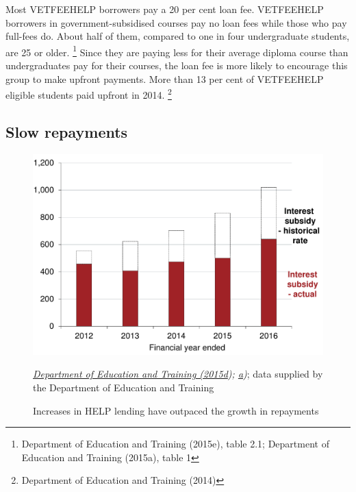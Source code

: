 \documentclass[embargoed]{grattan}
\begin{document}
{Most \gls{VETFEEHELP} borrowers pay a 20 per cent loan fee.
\gls{VETFEEHELP} borrowers in government-subsidised courses pay no loan fees while those who pay full-fees do.
About half of them, compared to one in four undergraduate students, are 25 or older.%
\footnote{Department of Education and Training (2015e), table 2.1; Department of Education and Training (2015a), table 1} Since they are paying less for their average diploma course than undergraduates pay for their courses, the loan fee is more likely to encourage this group to make upfront payments.
More than 13 per cent of \gls{VETFEEHELP} eligible students paid upfront in 2014.%
\footnote{Department of Education and Training (2014)}

\subsection{Slow repayments }\label{slow-repayments}

\begin{figure}
\caption{Increases in \gls{HELP} lending have outpaced the growth in repayments}\label{fig:fig7-increases-help-lending-outpaced-growth-repayments}


\includegraphics[page=7]{atlas/Chartpack.pdf}

%
{\emph{\protect\hyperlink{_ENREF_27}{Department of Education and Training (2015d}); \protect\hyperlink{_ENREF_24}{a})}; data supplied by the Department of Education and Training}
\end{figure}

}
\end{document}
